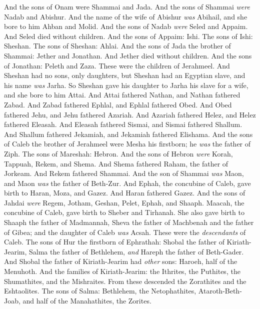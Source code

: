 \begin{biblechapter}
\verse And the sons of Onam were Shammai and Jada. And the sons of Shammai \textit{were} Nadab and Abishur.
\verse And the name of the wife of Abishur \textit{was} Abihail, and she bore to him Ahban and Molid.
\verse And the sons of Nadab \textit{were} Seled and Appaim. And Seled died without children.
\verse And the sons of Appaim: Ishi. The sons of Ishi: Sheshan. The sons of Sheshan: Ahlai.
\verse And the sons of Jada the brother of Shammai: Jether and Jonathan. And Jether died without children.
\verse And the sons of Jonathan: Peleth and Zaza. These were the children of Jerahmeel.
\verse And Sheshan had no sons, only daughters, but Sheshan had an Egyptian slave, and his name \textit{was} Jarha.
\verse So Sheshan gave his daughter to Jarha his slave for a wife, and she bore to him Attai.
\verse And Attai fathered Nathan, and Nathan fathered Zabad.
\verse And Zabad fathered Ephlal, and Ephlal fathered Obed.
\verse And Obed fathered Jehu, and Jehu fathered Azariah.
\verse And Azariah fathered Helez, and Helez fathered Eleasah.
\verse And Eleasah fathered Sismai, and Sismai fathered Shallum.
\verse And Shallum fathered Jekamiah, and Jekamiah fathered Elishama.
\verse And the sons of Caleb the brother of Jerahmeel were Mesha his firstborn; he \textit{was} the father of Ziph. The sons of Mareshah: Hebron.
\verse And the sons of Hebron \textit{were} Korah, Tappuah, Rekem, and Shema.
\verse And Shema fathered Raham, the father of Jorkeam. And Rekem fathered Shammai.
\verse And the son of Shammai \textit{was} Maon, and Maon \textit{was} the father of Beth-Zur.
\verse And Ephah, the concubine of Caleb, gave birth to Haran, Moza, and Gazez. And Haran fathered Gazez.
\verse And the sons of Jahdai \textit{were} Regem, Jotham, Geshan, Pelet, Ephah, and Shaaph.
\verse Maacah, the concubine of Caleb, gave birth to Sheber and Tirhanah.
\verse She also gave birth to Shaaph the father of Madmannah, Sheva the father of Machbenah and the father of Gibea; and the daughter of Caleb \textit{was} Acsah.
\verse These were the \textit{descendants} of Caleb.
\verse The sons of Hur the firstborn of Ephrathah: Shobal the father of Kiriath-Jearim,
\verse Salma the father of Bethlehem, \textit{and} Hareph the father of Beth-Gader.
\verse And Shobal the father of Kiriath-Jearim had \textit{other} sons: Haroeh, half of the Menuhoth.
\verse And the families of Kiriath-Jearim: the Ithrites, the Puthites, the Shumathites, and the Mishraites. From these descended the Zorathites and the Eshtaolites.
\verse The sons of Salma: Bethlehem, the Netophathites, Ataroth-Beth-Joab, and half of the Manahathites, the Zorites.
\end{biblechapter}

